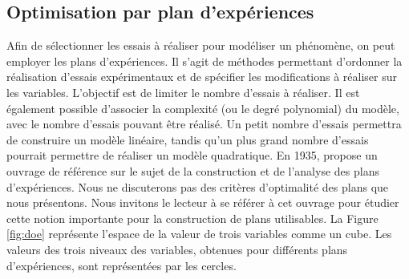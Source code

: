 \subsection{Optimisation par plan d'expériences} \label{subsec:doe}
Afin de sélectionner les essais à réaliser pour modéliser un phénomène, on peut employer les plans d'expériences.
Il s'agit de méthodes permettant d'ordonner la réalisation d'essais expérimentaux et de spécifier les modifications à réaliser sur les variables.
L'objectif est de limiter le nombre d'essais à réaliser.
Il est également possible d'associer la complexité (ou le degré polynomial) du modèle, avec le nombre d'essais pouvant être réalisé.
Un petit nombre d'essais permettra de construire un modèle linéaire, tandis qu'un plus grand nombre d'essais pourrait permettre de réaliser un modèle quadratique.
En 1935, \citeauthor{fisher_design_1974} \cite{fisher_design_1974} propose un ouvrage de référence sur le sujet de la construction et de l'analyse des plans d'expériences.
Nous ne discuterons pas des critères d'optimalité des plans que nous présentons. Nous invitons le lecteur à se référer à cet ouvrage pour étudier cette notion importante pour la construction de plans utilisables.
La Figure \ref{fig:doe} représente l'espace de la valeur de trois variables comme un cube.
Les valeurs des trois niveaux des variables, obtenues pour différents plans d'expériences, sont représentées par les cercles.

